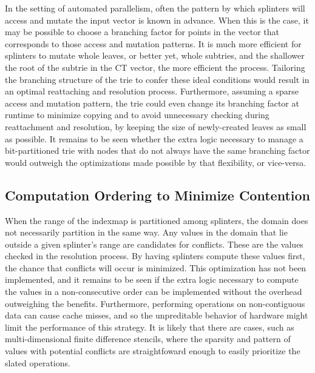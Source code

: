 In the setting of automated parallelism, often the pattern by which splinters
will access and mutate the input vector is known in advance. When this is the
case, it may be possible to choose a branching factor for points in the vector
that corresponds to those access and mutation patterns. It is much more
efficient for splinters to mutate whole leaves, or better yet, whole subtries,
and the shallower the root of the subtrie in the CT vector, the more efficient
the process. Tailoring the branching structure of the trie to confer these ideal
conditions would result in an optimal reattaching and resolution process.
Furthermore, assuming a sparse access and mutation pattern, the trie could even
change its branching factor at runtime to minimize copying and to avoid
unnecessary checking during reattachment and resolution, by keeping the size of
newly-created leaves as small as possible. It remains to be seen whether the extra
logic necessary to manage a bit-partitioned trie with nodes that do not always
have the same branching factor would outweigh the optimizations made possible by
that flexibility, or vice-versa.

\subsection{Computation Ordering to Minimize Contention}
When the range of the indexmap is partitioned among splinters, the domain does
not necessarily partition in the same way. Any values in the domain that lie
outside a given splinter's range are candidates for conflicts. These are the
values checked in the resolution process. By having splinters compute these
values first, the chance that conflicts will occur is minimized.
This optimization has not been implemented, and it remains to be seen if the
extra logic necessary to compute the values in a non-consecutive order can be
implemented without the overhead outweighing the benefits. Furthermore,
performing operations on non-contiguous data can cause cache misses, and so the
unpreditable behavior of hardware might limit the performance of this strategy.
It is likely that there are cases, such as multi-dimensional finite difference
stencils, where the sparsity and pattern of values with potential conflicts are
straightfoward enough to easily prioritize the slated operations.

